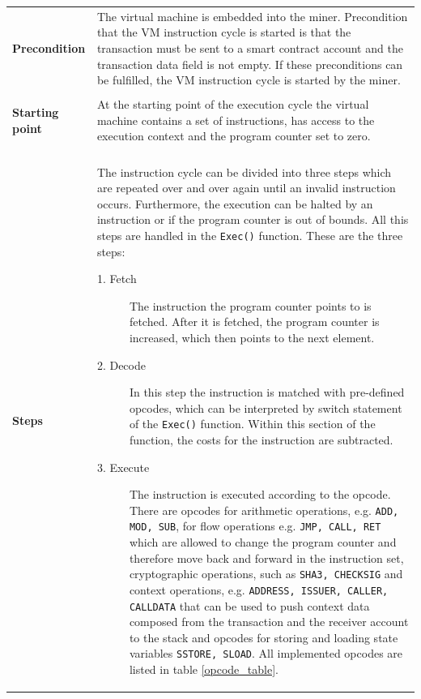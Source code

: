 \begin{tabular}[t]{ p{3cm} p{12.5cm}}
\raggedright
\textbf{Precondition} &
The virtual machine is embedded into the miner. Precondition that the VM instruction cycle is started is that the transaction must be sent to a smart contract account and the transaction data field is not empty. If these preconditions can be fulfilled, the VM instruction cycle is started by the miner. \\ \\

\raggedright
\textbf{Starting point} &
At the starting point of the execution cycle the virtual machine contains a set of instructions, has access to the execution context and the program counter set to zero. \\ \\

\textbf{Steps} &
The instruction cycle can be divided into three steps which are repeated over and over again until an invalid instruction occurs. Furthermore, the execution can be halted by an instruction or if the program counter is out of bounds. All this steps are handled in the \texttt{Exec()} function. These are the three steps:
\begin{description}
  \item[1. Fetch] The instruction the program counter points to is fetched. After it is fetched, the program counter is increased, which then points to the next element.
  \item[2. Decode] In this step the instruction is matched with pre-defined opcodes, which can be interpreted by switch statement of the \texttt{Exec()} function. Within this section of the function, the costs for the instruction are subtracted.
  \item[3. Execute] The instruction is executed according to the opcode. There are opcodes for arithmetic operations, e.g. \texttt{ADD, MOD, SUB}, for flow operations e.g. \texttt{JMP, CALL, RET} which are allowed to change the program counter and therefore move back and forward in the instruction set, cryptographic operations, such as \texttt{SHA3, CHECKSIG} and context operations, e.g. \texttt{ADDRESS, ISSUER, CALLER, CALLDATA} that can be used to push context data composed from the transaction and the receiver account to the stack and opcodes for storing and loading state variables \texttt{SSTORE, SLOAD}. All implemented opcodes are listed in table \ref{opcode_table}.
    \end{description}
\end{tabular}

